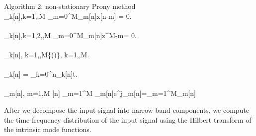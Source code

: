\begin{algorithm}{Algorithm 2: non-stationary Prony method}{}
       \\
     \displaystyle {}_k[n],k=1,\cdots,M \gets \sum_{m=0}^{M}_m[n]x[n-m] = 0. \\
       \\
     \displaystyle {}_k[n],k=1,2,\cdots,M \gets \sum_{m=0}^{M}_m[n]z^{M-m}= 0.\\
       \\
     \displaystyle \hat{\omega}_k[n], k=1,\cdots,M\gets\Re\left\{\left(\right)\right\}, k=1,\cdots,M.\\
        \\
     \displaystyle \hat{\phi}_k[n] = \sum_{k=0}^{n}\hat{\omega}_k[n]\Delta t.\\
        \\
     \displaystyle {}_m[n], m=1,\cdots M \gets {}[n] \approx \sum_{m=1}^M _m[n]e^{j\hat{\phi}_m[n]}=\sum_{m=1}^M_m[n]
\end{algorithm}





After we decompose the input signal into narrow-band components, 
we compute the time-frequency distribution of the input signal 
using the Hilbert transform of the intrinsic mode functions.

\newpage



